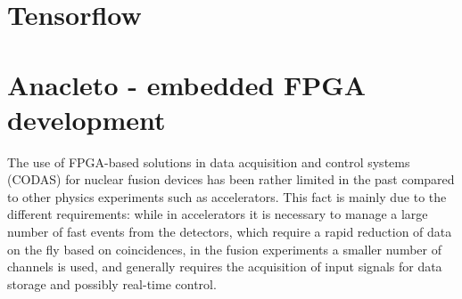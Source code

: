 %

\section{Tensorflow}



\section{Anacleto - embedded FPGA development}

The use of FPGA-based solutions in data acquisition and control systems (CODAS) for nuclear fusion devices has been rather limited in the past compared to other physics experiments such as accelerators. This fact is mainly due to the different requirements: while in accelerators it is necessary to manage a large number of fast events from the detectors, which require a rapid reduction of data on the fly based on coincidences, in the fusion experiments a smaller number of channels is used, and generally requires the acquisition of input signals for data storage and possibly real-time control. 
